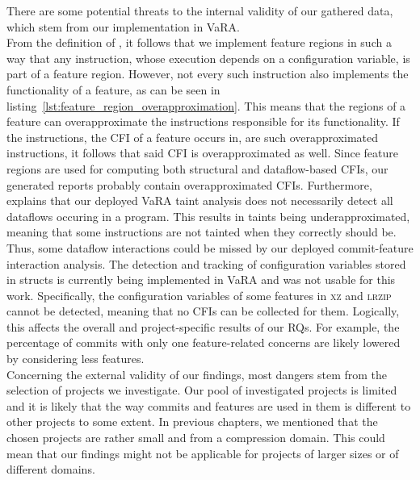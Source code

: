 There are some potential threats to the internal validity of our gathered data, which stem from our implementation in VaRA. \\
From the definition of , it follows that we implement feature regions in such a way that any instruction, whose execution depends on a configuration variable, is part of a feature region.
However, not every such instruction also implements the functionality of a feature, as can be seen in listing~\ref{lst:feature_region_overapproximation}.
This means that the regions of a feature can overapproximate the instructions responsible for its functionality.
If the instructions, the CFI of a feature occurs in, are such overapproximated instructions, it follows that said CFI is overapproximated as well.
Since feature regions are used for computing both structural and dataflow-based CFIs, our generated reports probably contain overapproximated CFIs.
Furthermore, \citet{sattler2023seal} explains that our deployed VaRA taint analysis does not necessarily detect all dataflows occuring in a program.
This results in taints being underapproximated, meaning that some instructions are not tainted when they correctly should be.
Thus, some dataflow interactions could be missed by our deployed commit-feature interaction analysis. 
The detection and tracking of configuration variables stored in structs is currently being implemented in VaRA and was not usable for this work.  
Specifically, the configuration variables of some features in \textsc{xz} and \textsc{lrzip} cannot be detected, meaning that no CFIs can be collected for them. 
Logically, this affects the overall and project-specific results of our RQs.
For example, the percentage of commits with only one feature-related concerns are likely lowered by considering less features. \\
Concerning the external validity of our findings, most dangers stem from the selection of projects we investigate.
Our pool of investigated projects is limited and it is likely that the way commits and features are used in them is different to other projects to some extent.
In previous chapters, we mentioned that the chosen projects are rather small and from a compression domain.
This could mean that our findings might not be applicable for projects of larger sizes or of different domains.
